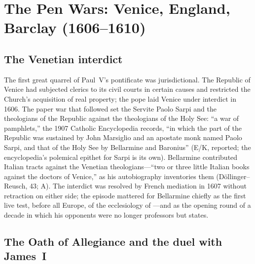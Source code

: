 \section{The Pen Wars: Venice, England, Barclay (1606--1610)}
\label{sec:penwars}

\subsection{The Venetian interdict}

The first great quarrel of Paul~V's pontificate was
jurisdictional. The Republic of Venice had subjected clerics to
its civil courts in certain causes and restricted the Church's
acquisition of real property; the pope laid Venice under interdict
in 1606. The paper war that followed set the Servite Paolo Sarpi
and the theologians of the Republic against the theologians of the
Holy See: ``a war of pamphlets,'' the 1907 Catholic Encyclopedia
records, ``in which the part of the Republic was sustained by John
Marsiglio and an apostate monk named Paolo Sarpi, and that of the
Holy See by Bellarmine and Baronius'' (E/K, reported; the
encyclopedia's polemical epithet for Sarpi is its own). Bellarmine
contributed Italian tracts against the Venetian
theologians---``two or three little Italian books against the
doctors of Venice,'' as his autobiography inventories them
(D\"ollinger--Reusch, 43; A). The interdict was resolved by French
mediation in 1607 without retraction on either side; the episode
mattered for Bellarmine chiefly as the first live test, before all
Europe, of the ecclesiology of ---and as
the opening round of a decade in which his opponents were no
longer professors but states.

\subsection{The Oath of Allegiance and the duel with James~I}

